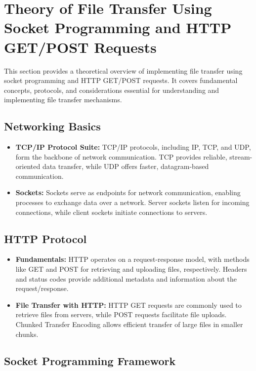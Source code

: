 \documentclass[11pt]{article}
\begin{document}
\section{Theory of File Transfer Using Socket Programming and HTTP GET/POST Requests}

This section provides a theoretical overview of implementing file transfer using socket programming and HTTP GET/POST requests. It covers fundamental concepts, protocols, and considerations essential for understanding and implementing file transfer mechanisms.

\subsection{Networking Basics}

\begin{itemize}
  \item \textbf{TCP/IP Protocol Suite:} TCP/IP protocols, including IP, TCP, and UDP, form the backbone of network communication. TCP provides reliable, stream-oriented data transfer, while UDP offers faster, datagram-based communication.
  \item \textbf{Sockets:} Sockets serve as endpoints for network communication, enabling processes to exchange data over a network. Server sockets listen for incoming connections, while client sockets initiate connections to servers.
\end{itemize}

\subsection{HTTP Protocol}

\begin{itemize}
  \item \textbf{Fundamentals:} HTTP operates on a request-response model, with methods like GET and POST for retrieving and uploading files, respectively. Headers and status codes provide additional metadata and information about the request/response.
  \item \textbf{File Transfer with HTTP:} HTTP GET requests are commonly used to retrieve files from servers, while POST requests facilitate file uploads. Chunked Transfer Encoding allows efficient transfer of large files in smaller chunks.
\end{itemize}

\subsection{Socket Programming Framework}
\end{document}
